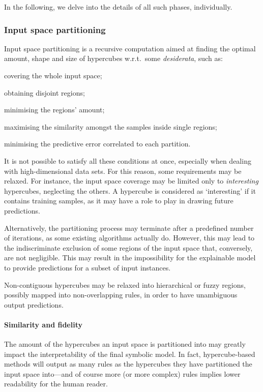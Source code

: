 \documentclass[
]{ceurart}
\begin{document}
In the following, we delve into the details of all such phases, individually.

\subsubsection{Input space partitioning}

Input space partitioning is a recursive computation aimed at finding the optimal amount, shape and size of hypercubes w.r.t.\ some \emph{desiderata}, such as:
%
\begin{inlinelist}
	\item covering the whole input space;
	\item obtaining disjoint regions;
	\item minimising the regions' amount;
	\item maximising the similarity amongst the samples inside single regions;
	\item minimising the predictive error correlated to each partition.
\end{inlinelist}

It is not possible to satisfy all these conditions at once, especially when dealing with high-dimensional data sets.
%
For this reason, some requirements may be relaxed.
%
For instance, the input space coverage may be limited only to \emph{interesting} hypercubes, neglecting the others.
%
A hypercube is considered as `interesting' if it contains training samples, as it may have a role to play in drawing future predictions.

Alternatively, the partitioning process may terminate after a predefined number of iterations, as some existing algorithms actually do.
%
However, this may lead to the indiscriminate exclusion of some regions of the input space that, conversely, are not negligible.
%
This may result in the impossibility for the explainable model to provide predictions for a subset of input instances.

Non-contiguous hypercubes may be relaxed into hierarchical or fuzzy regions, possibly mapped into non-overlapping rules, in order to have unambiguous output predictions.

\paragraph{Similarity and fidelity}

The amount of the hypercubes an input space is partitioned into may greatly impact the interpretability of the final symbolic model.
%
In fact, hypercube-based methods will output as many rules as the hypercubes they have partitioned the input space into---and of course more (or more complex) rules implies lower readability for the human reader.
\end{document}
